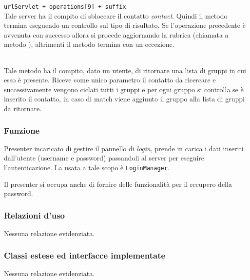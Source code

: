 \begin{description}
\verb|urlServlet + operations[9] + suffix|\\

Tale server ha il compito di sbloccare il contatto \textit{contact}. Quindi il metodo termina eseguendo un controllo sul tipo di risultato. Se l'operazione precedente è avvenuta con successo allora si procede aggiornando la rubrica (chiamata a metodo ), altrimenti il metodo termina con un eccezione.

\item{}\\
Tale metodo ha il compito, dato un utente, di ritornare una lista di gruppi in cui esso è presente. Riceve come unico parametro il contatto da ricercare e successivamente vengono ciclati tutti i gruppi e per ogni gruppo si controlla se è inserito il contatto, in caso di match viene aggiunto il gruppo alla lista di gruppi da ritornare.


\end{description}


\subsubsection*{Funzione}
Presenter incaricato di gestire il pannello di \textit{login}, prende in carica i dati inseriti dall'utente (username e password) passandoli al server per eseguire l'autenticazione. La  usata a tale scopo è \texttt{LoginManager}.

Il presenter si occupa anche di fornire delle funzionalità per il recupero della password.

\subsubsection*{Relazioni d'uso}

Nessuna relazione evidenziata.

\subsubsection*{Classi estese ed interfacce implementate}

Nessuna relazione evidenziata.

